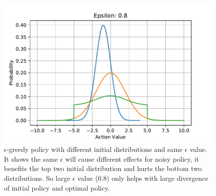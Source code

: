 \documentclass{article}
\begin{document}
\begin{figure}[htbp]
	\includegraphics[scale=0.4]{img/noise58.pdf}
	\caption{$\epsilon$-greedy policy with different initial distributions and same $\epsilon$ value. It shows the same $\epsilon$ will cause different effects for noisy policy, it benefits the top two initial distribution and hurts the bottom two distributions. So large $\epsilon$ value (0.8) only helps with large divergence of initial policy and optimal policy. }
	\label{fig:noise1}
\end{figure}
\end{document}
